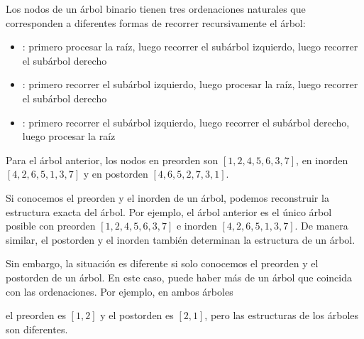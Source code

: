 Los nodos de un árbol binario tienen tres ordenaciones
naturales que corresponden a diferentes formas de
recorrer recursivamente el árbol:

\begin{itemize}
\item {}: primero procesar la raíz,
luego recorrer el subárbol izquierdo, luego recorrer el subárbol derecho
\item {}: primero recorrer el subárbol izquierdo,
luego procesar la raíz, luego recorrer el subárbol derecho
\item {}: primero recorrer el subárbol izquierdo,
luego recorrer el subárbol derecho, luego procesar la raíz
\end{itemize}

Para el árbol anterior, los nodos en
preorden son
$[1,2,4,5,6,3,7]$,
en inorden $[4,2,6,5,1,3,7]$
y en postorden $[4,6,5,2,7,3,1]$.

Si conocemos el preorden y el inorden
de un árbol, podemos reconstruir la estructura exacta del árbol.
Por ejemplo, el árbol anterior es el único árbol posible
con preorden $[1,2,4,5,6,3,7]$ e
inorden $[4,2,6,5,1,3,7]$.
De manera similar, el postorden y el inorden
también determinan la estructura de un árbol.

Sin embargo, la situación es diferente si solo conocemos
el preorden y el postorden de un árbol.
En este caso, puede haber más de un árbol
que coincida con las ordenaciones.
Por ejemplo, en ambos árboles
\begin{center}
\end{center}
el preorden es $[1,2]$ y el postorden es $[2,1]$,
pero las estructuras de los árboles son diferentes.

